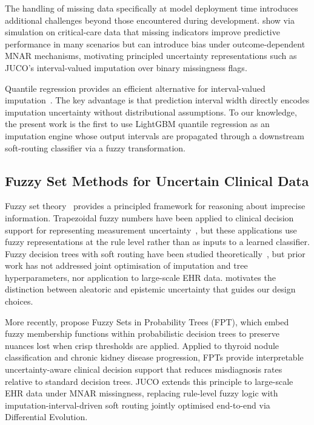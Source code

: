 \documentclass[a4paper,fleqn,longmktitle]{cas-sc}
\begin{document}
	The handling of missing data specifically at model deployment time
	introduces additional challenges beyond those encountered during
	development. \citet{sisk2023imputation} show via simulation on
	critical-care data that missing indicators improve predictive
	performance in many scenarios but can introduce bias under
	outcome-dependent MNAR mechanisms, motivating principled
	uncertainty representations such as JUCO's interval-valued
	imputation over binary missingness flags.
	
	Quantile regression provides an efficient alternative for
	interval-valued imputation~\citep{meinshausen2006quantile}.
	The key advantage is that prediction interval width directly
	encodes imputation uncertainty without distributional assumptions.
	To our knowledge, the present work is the first to use LightGBM
	quantile regression as an imputation engine whose output intervals
	are propagated through a downstream soft-routing classifier via a
	fuzzy transformation.
	
	\subsection{Fuzzy Set Methods for Uncertain Clinical Data}
	\label{sec:rw_fuzzy}
	
	Fuzzy set theory~\citep{zadeh1965fuzzy} provides a principled
	framework for reasoning about imprecise information.
	Trapezoidal fuzzy numbers have been applied to clinical decision
	support for representing measurement
	uncertainty~\citep{adlassnig1986fuzzy, torres2013fuzzy},
	but these applications use fuzzy representations at the rule level
	rather than as inputs to a learned classifier.
	Fuzzy decision trees with soft routing have been studied
	theoretically~\citep{olaru2003complete, yuan1995induction},
	but prior work has not addressed joint optimisation of imputation
	and tree hyperparameters, nor application to large-scale EHR data.
	\citet{hullermeier2021aleatoric} motivates the distinction between
	aleatoric and epistemic uncertainty that guides our design choices.
	
	More recently, \citet{capitoli2025fuzzy} propose Fuzzy Sets in
	Probability Trees (FPT), which embed fuzzy membership functions
	within probabilistic decision trees to preserve nuances lost when
	crisp thresholds are applied.
	Applied to thyroid nodule classification and chronic kidney disease
	progression, FPTs provide interpretable uncertainty-aware clinical
	decision support that reduces misdiagnosis rates relative to
	standard decision trees.
	JUCO extends this principle to large-scale EHR data under MNAR
	missingness, replacing rule-level fuzzy logic with
	imputation-interval-driven soft routing jointly optimised
	end-to-end via Differential Evolution.
	
\end{document}
